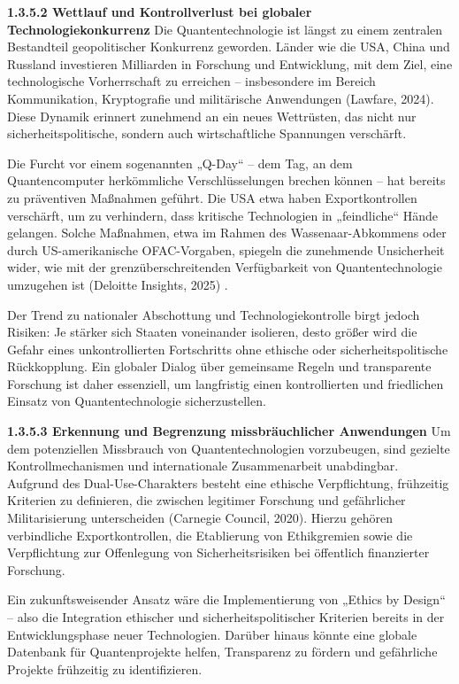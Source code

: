 {\textbf{ 1.3.5.2 Wettlauf und Kontrollverlust bei globaler Technologiekonkurrenz} 
Die Quantentechnologie ist längst zu einem zentralen Bestandteil geopolitischer Konkurrenz geworden. Länder wie die USA, China und Russland investieren Milliarden in Forschung und Entwicklung, mit dem Ziel, eine technologische Vorherrschaft zu erreichen – insbesondere im Bereich Kommunikation, Kryptografie und militärische Anwendungen (Lawfare, 2024)\cite{howell_restrict_2023}. Diese Dynamik erinnert zunehmend an ein neues Wettrüsten, das nicht nur sicherheitspolitische, sondern auch wirtschaftliche Spannungen verschärft.

Die Furcht vor einem sogenannten „Q-Day“ – dem Tag, an dem Quantencomputer herkömmliche Verschlüsselungen brechen können – hat bereits zu präventiven Maßnahmen geführt. Die USA etwa haben Exportkontrollen verschärft, um zu verhindern, dass kritische Technologien in „feindliche“ Hände gelangen. Solche Maßnahmen, etwa im Rahmen des Wassenaar-Abkommens oder durch US-amerikanische OFAC-Vorgaben, spiegeln die zunehmende Unsicherheit wider, wie mit der grenzüberschreitenden Verfügbarkeit von Quantentechnologie umzugehen ist (Deloitte Insights, 2025) \cite{buchholz_quantum_nodate}.

Der Trend zu nationaler Abschottung und Technologiekontrolle birgt jedoch Risiken: Je stärker sich Staaten voneinander isolieren, desto größer wird die Gefahr eines unkontrollierten Fortschritts ohne ethische oder sicherheitspolitische Rückkopplung. Ein globaler Dialog über gemeinsame Regeln und transparente Forschung ist daher essenziell, um langfristig einen kontrollierten und friedlichen Einsatz von Quantentechnologie sicherzustellen.

 \textbf{1.3.5.3 Erkennung und Begrenzung missbräuchlicher Anwendungen }
 Um dem potenziellen Missbrauch von Quantentechnologien vorzubeugen, sind gezielte Kontrollmechanismen und internationale Zusammenarbeit unabdingbar. Aufgrund des Dual-Use-Charakters besteht eine ethische Verpflichtung, frühzeitig Kriterien zu definieren, die zwischen legitimer Forschung und gefährlicher Militarisierung unterscheiden (Carnegie Council, 2020)\cite{malekos_smith_preparing_2023}. Hierzu gehören verbindliche Exportkontrollen, die Etablierung von Ethikgremien sowie die Verpflichtung zur Offenlegung von Sicherheitsrisiken bei öffentlich finanzierter Forschung.

Ein zukunftsweisender Ansatz wäre die Implementierung von „Ethics by Design“ – also die Integration ethischer und sicherheitspolitischer Kriterien bereits in der Entwicklungsphase neuer Technologien. Darüber hinaus könnte eine globale Datenbank für Quantenprojekte helfen, Transparenz zu fördern und gefährliche Projekte frühzeitig zu identifizieren.

}
